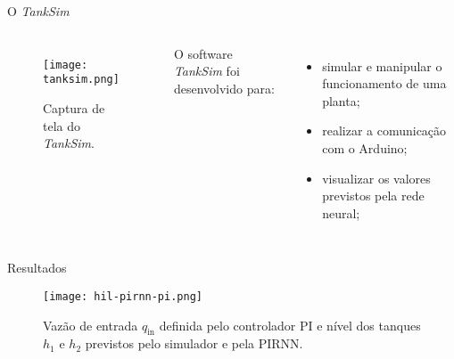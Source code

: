 \begin{frame}{O \textit{TankSim}}
  \begin{columns}
    \begin{figure}
      \centering
      \texttt{[image: tanksim.png]}
      \caption{Captura de tela do \textit{TankSim}.}
    \end{figure}

    O software \textit{TankSim} foi desenvolvido para:
    \begin{itemize}
      \item simular e manipular o funcionamento de uma planta;
      \item realizar a comunicação com o Arduino;
      \item visualizar os valores previstos pela rede neural;
    \end{itemize}

  \end{columns}
\end{frame}

\begin{frame}{Resultados}
  \begin{figure}
    \centering
    \texttt{[image: hil-pirnn-pi.png]}
    \caption{Vazão de entrada $q_{\mathrm{in}}$ definida pelo controlador PI e nível dos tanques $h_1$ e $h_2$ previstos pelo simulador e pela PIRNN.}
  \end{figure}
\end{frame}
